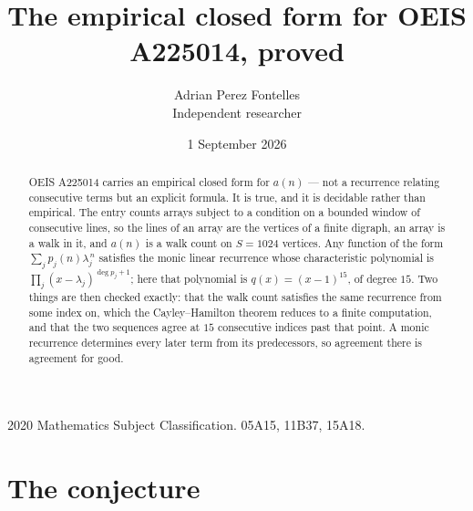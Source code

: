 \documentclass[11pt,a4paper]{article}
\title{The empirical closed form for OEIS A225014, proved}
\author{Adrian Perez Fontelles\\ \small Independent researcher}
\date{1 September 2026}
\theoremstyle{plain}
\theoremstyle{definition}
\begin{document}
\maketitle

\begin{abstract}
OEIS A225014 carries an empirical closed form for $a(n)$ --- not a recurrence relating
consecutive terms but an explicit formula. It is true, and it is decidable rather than
empirical. The entry counts arrays subject to a condition on a bounded window of consecutive lines, so the lines of an array are the
vertices of a finite digraph, an array is a walk in it, and $a(n)$ is a walk count on
$S=1024$ vertices. Any function of the form $\sum_j p_j(n)\lambda_j^{\,n}$ satisfies the
monic linear recurrence whose characteristic polynomial is
$\prod_j(x-\lambda_j)^{\deg p_j+1}$; here that polynomial is $q(x)=(x-1)^{15}$, of degree
$15$. Two things are then checked exactly: that the walk count satisfies the same
recurrence from some index on, which the Cayley--Hamilton theorem reduces to a finite
computation, and that the two sequences agree at $15$ consecutive indices past that
point. A monic recurrence determines every later term from its predecessors, so agreement
there is agreement for good.
\end{abstract}

\noindent\small 2020 Mathematics Subject Classification. 05A15, 11B37, 15A18.\normalsize

\section{The conjecture}
\end{document}
